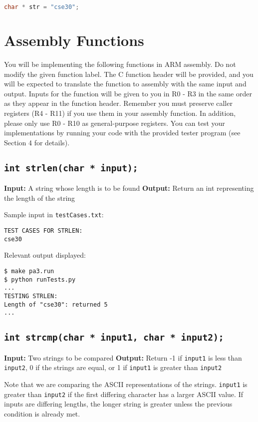 \documentclass{article}
\begin{document}
\begin{lstlisting}[language = C]
char * str = "cse30";
\end{lstlisting}

\section{Assembly Functions}
You will be implementing the following functions in ARM assembly. Do not modify the given function label. The C function header will be provided, and you will be expected to translate the function to assembly with the same input and output. Inputs for the function will be given to you in R0 - R3 in the same order as they appear in the function header. Remember you must preserve caller registers (R4 - R11) if you use them in your assembly function. In addition, please only use R0 - R10 as general-purpose registers. You can test your implementations by running your code with the provided tester program (see Section 4 for details).

\subsection{ {\tt int strlen(char * input);}}
\textbf{Input:} A string whose length is to be found \newline
\textbf{Output:} Return an int representing the length of the string\newline

\noindent Sample input in {\tt testCases.txt}:
\begin{verbatim}
TEST CASES FOR STRLEN:
cse30
\end{verbatim}

\noindent Relevant output displayed:
\begin{verbatim}
$ make pa3.run
$ python runTests.py 
...
TESTING STRLEN:
Length of "cse30": returned 5
...
\end{verbatim}

\subsection{{\tt int strcmp(char * input1, char * input2);}}
\textbf{Input:} Two strings to be compared \newline
\textbf{Output:} Return -1 if {\tt input1} is less than {\tt input2}, 0 if the strings are equal, or 1 if {\tt input1} is greater than {\tt input2} \newline

\noindent Note that we are comparing the ASCII representations of the strings. {\tt input1} is greater than {\tt input2} if the first differing character has a larger ASCII value. If inputs are differing lengths, the longer string is greater unless the previous condition is already met.
\noindent \newline
\end{document}
